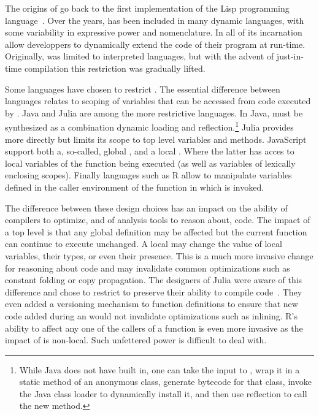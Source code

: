 \documentclass[conference]{IEEEtran}
\begin{document}
The origins of \eval go back to the first implementation of the Lisp
programming language~\cite{lisp}. Over the years, \eval has been included in
many dynamic languages, with some variability in expressive power and
nomenclature. In all of its incarnation \eval allow developpers to
dynamically extend the code of their program at run-time.  Originally, \eval
was limited to interpreted languages, but with the advent of just-in-time
compilation this restriction was gradually lifted.

Some languages have chosen to restrict \eval. The essential difference
between languages relates to scoping of variables that can be accessed from
code executed by \eval.  Java and Julia are among the more restrictive
languages. In Java, \eval must be synthesized as a combination dynamic
loading and reflection.\footnote{While Java does not have \eval built in,
  one can take the input to \eval, wrap it in a static method of an
  anonymous class, generate bytecode for that class, invoke the Java class
  loader to dynamically install it, and then use reflection to call the new
  method.} Julia provides \eval more directly but limits its scope to top
level variables and methods. JavaScript support both a, so-called, global
\eval, and a local \eval. Where the latter has acces to local variables of
the function being executed (as well as variables of lexically enclosing
scopes). Finally languages such as R allow \eval to manipulate variables
defined in the caller environment of the function in which \eval is invoked.

The difference between these design choices has an impact on the ability of
compilers to optimize, and of analysis tools to reason about, code. The
impact of a top level \eval is that any global definition may be affected
but the current function can continue to execute unchanged. A local \eval
may change the value of local variables, their types, or even their
presence. This is a much more invasive change for reasoning about code and
may invalidate common optimizations such as constant folding or copy
propagation. The designers of Julia were aware of this difference and chose
to restrict \eval to preserve their ability to compile
code~\cite{oopsla18a}. They even added a versioning mechanism to function
definitions to ensure that new code added during an \eval would not
invalidate optimizations such as inlining.  R's ability to affect any one of
the callers of a function is even more invasive as the impact of \eval is
non-local. Such unfettered power is difficult to deal with.
\end{document}
